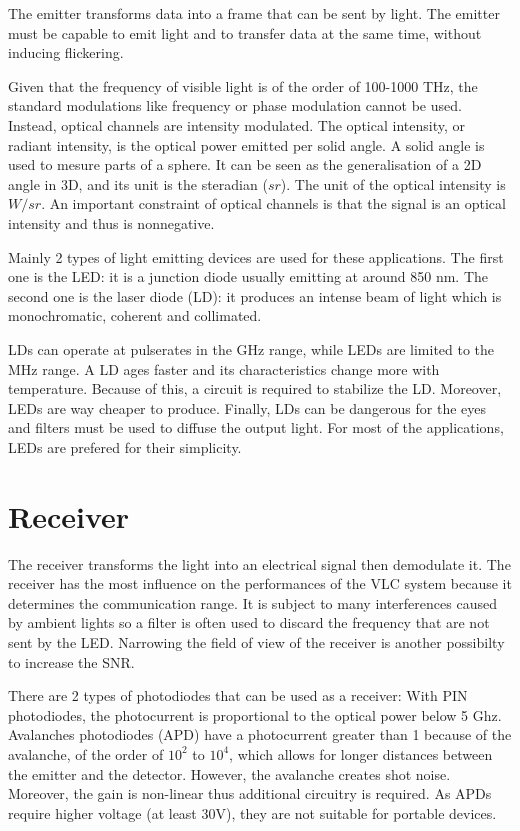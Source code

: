 \documentclass[12pt]{report}
\begin{document}
The emitter transforms data into a frame that can be sent by light. The emitter must be capable to emit light and to transfer data at the same time, without inducing flickering.

Given that the frequency of visible light is of the order of 100-1000 THz, the standard modulations like frequency or phase modulation cannot be used. Instead, optical channels are intensity modulated. The optical intensity, or radiant intensity, is the optical power emitted per solid angle. A solid angle is used to mesure parts of a sphere. It can be seen as the generalisation of a 2D angle in 3D, and its unit is the steradian ($sr$). The unit of the optical intensity is $W/sr$. An important constraint of optical channels is that the signal is an optical intensity and thus is nonnegative.

Mainly 2 types of light emitting devices are used for these applications.
The first one is the LED: it is a junction diode usually emitting at around 850 nm.
The second one is the laser diode (LD): it produces an intense beam of light which is monochromatic, coherent and collimated.

LDs can operate at pulserates in the GHz range, while LEDs are limited to the MHz range. A LD ages faster and its characteristics change more with temperature. Because of this, a circuit is required to stabilize the LD. Moreover, LEDs are way cheaper to produce. Finally, LDs can be dangerous for the eyes and filters must be used to diffuse the output light. For most of the applications, LEDs are prefered for their simplicity.

\section{Receiver}

The receiver transforms the light into an electrical signal then demodulate it. The receiver has the most influence on the performances of the VLC system because it determines the communication range. It is subject to many interferences caused by ambient lights so a filter is often used to discard the frequency that are not sent by the LED. Narrowing the field of view of the receiver is another possibilty to increase the SNR.

There are 2 types of photodiodes that can be used as a receiver:
With PIN photodiodes, the photocurrent is proportional to the optical power below 5 Ghz.
Avalanches photodiodes (APD) have a photocurrent greater than 1 because of the avalanche, of the order of $10^2$ to $10^4$, which allows for longer distances between the emitter and the detector. However, the avalanche creates shot noise. Moreover, the gain is non-linear thus additional circuitry is required. As APDs require higher voltage (at least 30V), they are not suitable for portable devices.
\end{document}
